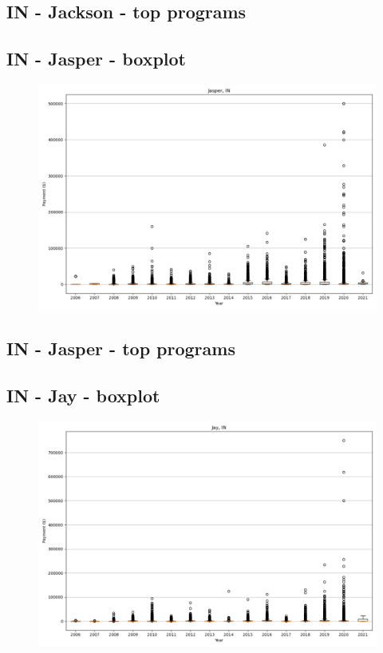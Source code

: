 \subsection*{IN - Jackson - top programs}

\newpage
\subsection*{IN - Jasper - boxplot}
\begin{figure}[h]
\centering
\includegraphics[width=7in]{../output/boxplots/counties/Jasper-IN_boxplot.png}
\end{figure}


\subsection*{IN - Jasper - top programs}

\newpage
\subsection*{IN - Jay - boxplot}
\begin{figure}[h]
\centering
\includegraphics[width=7in]{../output/boxplots/counties/Jay-IN_boxplot.png}
\end{figure}


